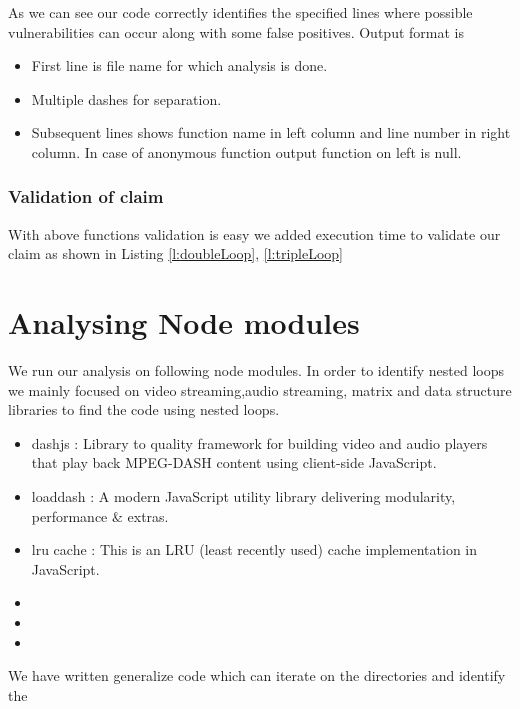 \documentclass[authoryear,preprint]{sigplanconf}
\begin{document}
As we can see our code correctly identifies the specified lines where possible vulnerabilities can occur along with some false positives.
Output format is
\begin{itemize}
\item First line is file name for which analysis is done.
\item Multiple dashes for separation.
\item Subsequent lines shows function name in left column and line number in right column. In case of anonymous function output function on left is null.

\end{itemize}

\subsubsection{Validation of claim}
With above functions validation is easy we added execution time to validate our claim as shown in Listing \ref{l:doubleLoop}, \ref{l:tripleLoop}

\section{Analysing Node modules}
We run our analysis on following node modules. In order to identify nested loops we mainly focused on video streaming,audio streaming, matrix and data structure libraries to find the code using nested loops.

\begin{itemize}
\item dashjs : Library to quality framework for building video and audio players that play back MPEG-DASH content using client-side JavaScript.

\item loaddash : A modern JavaScript utility library delivering modularity, performance & extras.
\item lru cache : This is an LRU (least recently used) cache implementation in JavaScript.
\item 
\item 
\item 
\end{itemize}
We have written generalize code which can iterate on the directories and identify the


\citep{Aho86-Compilers}

\end{document}

